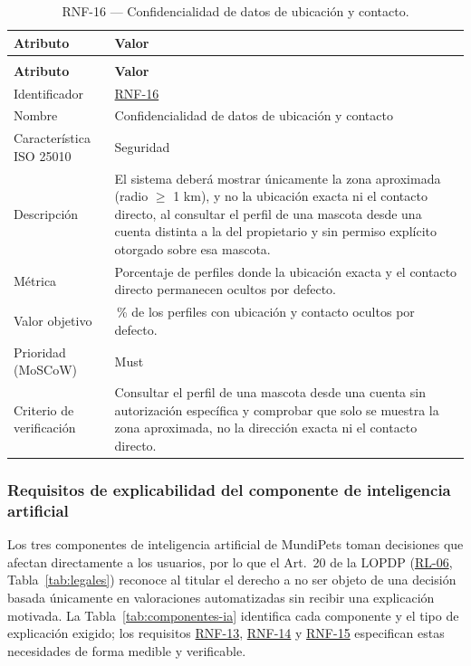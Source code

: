 \documentclass[journal,onecolumn]{IEEEtran}
\makeatletter
\newenvironment{atributos}[2]{%
	\small
	\begin{longtable}{@{}>{\raggedright\arraybackslash}p{4.2cm} >{\raggedright\arraybackslash}p{11.2cm}@{}}
		\caption{#2}\label{tab:#1}\\
		\toprule
		\textbf{Atributo} & \textbf{Valor} \\
		\midrule
		\endfirsthead
		\multicolumn{2}{@{}l}{\small\itshape (continuación)}\\
		\toprule
		\textbf{Atributo} & \textbf{Valor} \\
		\midrule
		\endhead
		\bottomrule
		\endlastfoot
	}{%
	\end{longtable}
	\normalsize
}
\makeatother
\begin{document}
	\begin{atributos}{RNF-16}{RNF-16 --- Confidencialidad de datos de ubicación y contacto.}
		Identificador & \hyperref[tab:RNF-16]{RNF-16} \\
		Nombre & Confidencialidad de datos de ubicación y contacto \\
		Característica ISO 25010 & Seguridad \\
		Descripción & El sistema deberá mostrar únicamente la zona aproximada (radio $\geq$ 1 km), y no la ubicación exacta ni el contacto directo, al consultar el perfil de una mascota desde una cuenta distinta a la del propietario y sin permiso explícito otorgado sobre esa mascota. \\
		Métrica & Porcentaje de perfiles donde la ubicación exacta y el contacto directo permanecen ocultos por defecto. \\
		Valor objetivo & 100\,\% de los perfiles con ubicación y contacto ocultos por defecto. \\
		Prioridad (MoSCoW) & Must \\
		Criterio de verificación & Consultar el perfil de una mascota desde una cuenta sin autorización específica y comprobar que solo se muestra la zona aproximada, no la dirección exacta ni el contacto directo. \\
	\end{atributos}
	
	\subsubsection{Requisitos de explicabilidad del componente de inteligencia artificial}
	\label{sec:explicabilidad}
	
	Los tres componentes de inteligencia artificial de MundiPets toman decisiones
	que afectan directamente a los usuarios, por lo que el Art.~20 de la LOPDP
	(\hyperref[rl:06]{RL-06}, Tabla~\ref{tab:legales}) reconoce al titular el derecho a no ser objeto
	de una decisión basada únicamente en valoraciones automatizadas sin recibir una
	explicación motivada. La Tabla~\ref{tab:componentes-ia} identifica cada
	componente y el tipo de explicación exigido; los requisitos \hyperref[tab:RNF-13]{RNF-13}, \hyperref[tab:RNF-14]{RNF-14} y
	\hyperref[tab:RNF-15]{RNF-15} especifican estas necesidades de forma medible y verificable.
	
\end{document}
